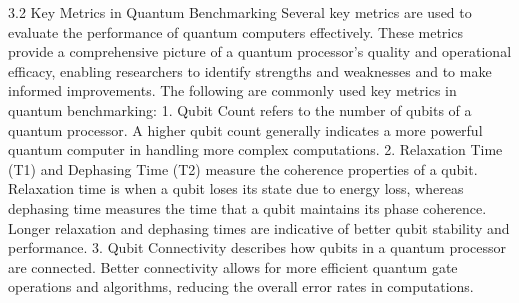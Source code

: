 3.2 Key Metrics in Quantum Benchmarking Several key metrics are used to evaluate the performance of quantum computers effectively. These metrics provide a comprehensive picture of a quantum processor’s quality and operational efficacy, enabling researchers to identify strengths and weaknesses and to make informed improvements. The following are commonly used key metrics in quantum benchmarking: 1. Qubit Count refers to the number of qubits of a quantum processor. A higher qubit count generally indicates a more powerful quantum computer in handling more complex computations. 2. Relaxation Time (T1) and Dephasing Time (T2) measure the coherence properties of a qubit. Relaxation time is when a qubit loses its state due to energy loss, whereas dephasing time measures the time that a qubit maintains its phase coherence. Longer relaxation and dephasing times are indicative of better qubit stability and performance. 3. Qubit Connectivity describes how qubits in a quantum processor are connected. Better connectivity allows for more efficient quantum gate operations and algorithms, reducing the overall error rates in computations.
